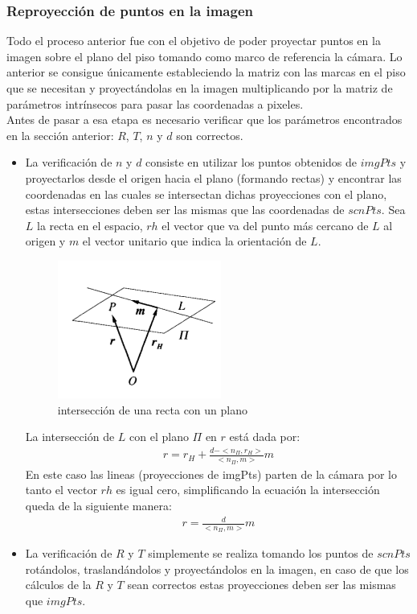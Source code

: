        	\subsubsection{Reproyección de puntos en la imagen}
       	Todo el proceso anterior fue con el objetivo de poder proyectar puntos en la imagen sobre el plano del piso tomando como marco de referencia la cámara. Lo anterior se consigue únicamente estableciendo la matriz con las marcas en el piso que se necesitan y proyectándolas en la imagen multiplicando por la matriz de parámetros intrínsecos para pasar las coordenadas a pixeles.\\
       	Antes de pasar a esa etapa es necesario verificar que los parámetros encontrados en la sección anterior: $R$, $T$, $n$ y $d$ son correctos. 
       	\begin{itemize}
       		\item La verificación de $n$ y $d$ consiste en utilizar los puntos obtenidos de $imgPts$ y proyectarlos desde el origen hacia el plano (formando rectas) y encontrar las coordenadas en las cuales se intersectan dichas proyecciones con el plano, estas intersecciones deben ser las mismas que las coordenadas de $scnPts$. Sea $L$ la recta en el espacio, $rh$ el vector que va del punto más cercano de $L$ al origen y $m$ el vector unitario que indica la orientación de $L$. 
       		\begin{figure}[htbp]
       			\centering
       			\includegraphics[width=.35\textwidth]{./pictures/intersec}
       			\caption{intersección de una recta con un plano}\label{fig: figura}
       		\end{figure}
       		
       		La intersección de $L$ con el plano $\Pi$ en $r$ está dada por:
       		\begin{eqnarray}
       		r=r_H+\frac{d-<n_{\Pi}, r_H>}{<n_{\Pi},m>}m
       		\end{eqnarray}
       		En este caso las lineas (proyecciones de imgPts) parten de la cámara por lo tanto el vector $rh$ es igual cero, simplificando la ecuación la intersección queda de la siguiente manera:
       		\begin{eqnarray}
       		r=\frac{d}{<n_{\Pi},m>}m
       		\end{eqnarray}	
       		
       		\item La verificación de $R$ y $T$ simplemente se realiza tomando los puntos de $scnPts$ rotándolos, traslandándolos y proyectándolos en la imagen, en caso de que los cálculos de la $R$ y $T$ sean correctos estas proyecciones deben ser las mismas que $imgPts$.
       	\end{itemize}
